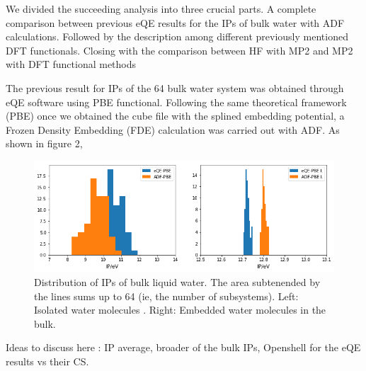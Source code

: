 \documentclass[12pt,a4paper]{article}
\begin{document}
We divided the succeeding analysis into three crucial parts. A complete comparison between previous eQE results for the
IPs of bulk water with ADF calculations. Followed by the description among different previously mentioned DFT functionals.
Closing with the comparison between HF with MP2 and MP2 with DFT functional methods

The previous result for IPs of the 64 bulk water system was obtained through eQE software using PBE functional. Following
the same theoretical framework (PBE) once we obtained the cube file with the splined embedding potential, a Frozen Density 
Embedding (FDE) calculation was carried out with ADF. As shown in figure 2,

\begin{figure}[!h]
        \centering
        \includegraphics[width=\linewidth]{eQE-ADF}
        \caption{Distribution of IPs of bulk liquid water. The area subtenended by the lines sums up to 64 (ie, the number of subsystems). Left: Isolated water molecules . Right: Embedded water molecules in the bulk. }
\end{figure}

Ideas to discuss here : IP average, broader of the bulk IPs, Openshell for the eQE results vs their CS.
\end{document}
